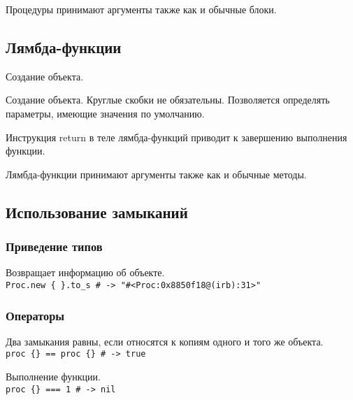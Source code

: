 Процедуры принимают аргументы также как и обычные блоки.

\subsection{Лямбда-функции}

\begin{methodlist}
  Создание объекта.

  Создание объекта. Круглые скобки не обязательны. Позволяется определять параметры, имеющие значения по умолчанию.
\end{methodlist}

Инструкция return в теле лямбда-функций приводит к завершению выполнения функции.

Лямбда-функции принимают аргументы также как и обычные методы.

\subsection{Использование замыканий}

\subsubsection*{Приведение типов}

\begin{methodlist}
 
  Возвращает информацию об объекте. 
  \\\verb!Proc.new { }.to_s # -> "#<Proc:0x8850f18@(irb):31>"!
\end{methodlist}

\subsubsection*{Операторы}

\begin{methodlist}
  Два замыкания равны, если относятся к копиям одного и того же объекта. 
  \\\verb!proc {} == proc {} # -> true!

  Выполнение функции.
  \\\verb!proc {} === 1 # -> nil!
\end{methodlist}

